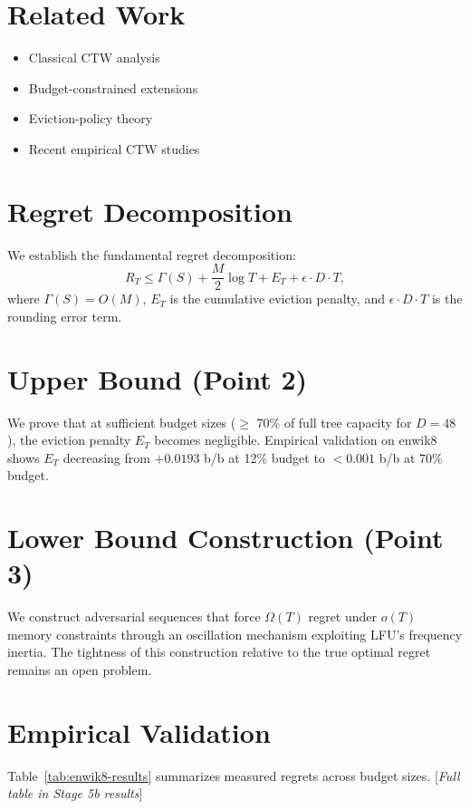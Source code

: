 \documentclass[11pt]{article}
\begin{document}
\tableofcontents

\section{Related Work}
\label{sec:related}
\begin{itemize}
    \item Classical CTW analysis \cite{willems1998context}
    \item Budget-constrained extensions
    \item Eviction-policy theory \cite{metwally2005spacingsaving, berinde2009approximating}
    \item Recent empirical CTW studies \cite{stage5bresults}
\end{itemize}

\section{Regret Decomposition}
\label{sec:regret}
We establish the fundamental regret decomposition:
\[
R_T \leq \Gamma(S) + \frac{M}{2}\log T + E_T + \epsilon\cdot D\cdot T,
\]
where $\Gamma(S) = O(M)$, $E_T$ is the cumulative eviction penalty, and $\epsilon\cdot D\cdot T$ is the rounding error term.

\section{Upper Bound (Point 2)}
\label{sec:upper}
We prove that at sufficient budget sizes ($\geq$ 70\% of full tree capacity for $D=48$), the eviction penalty $E_T$ becomes negligible. Empirical validation on enwik8 shows $E_T$ decreasing from $+0.0193$ b/b at 12\% budget to $<0.001$ b/b at 70\% budget.

\section{Lower Bound Construction (Point 3)}
\label{sec:lower}
We construct adversarial sequences that force $\Omega(T)$ regret under $o(T)$ memory constraints through an oscillation mechanism exploiting LFU's frequency inertia. The tightness of this construction relative to the true optimal regret remains an open problem.

\section{Empirical Validation}
\label{sec:empirical}
Table~\ref{tab:enwik8-results} summarizes measured regrets across budget sizes. [\textit{Full table in Stage 5b results}]
\end{document}
